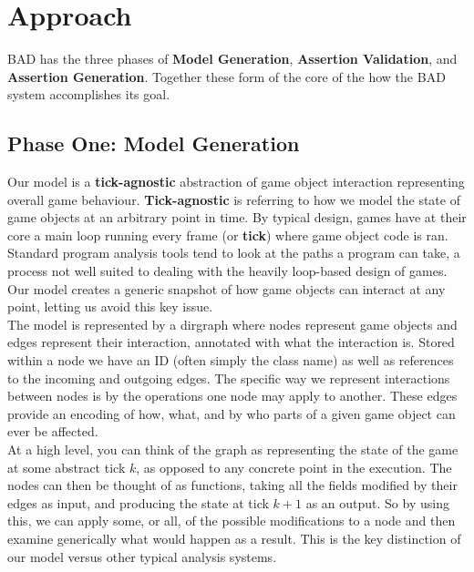 \documentclass[letterpaper,twocolumn,10pt]{article}
\begin{document}
\section{Approach}

BAD has the three phases of \textbf{Model Generation}, \textbf{Assertion Validation}, and \textbf{Assertion Generation}. Together these form of the core of the how the BAD system accomplishes its goal. 

\subsection{Phase One: Model Generation}

Our model is a \textbf{tick-agnostic} abstraction of game object interaction representing overall game behaviour. \textbf{Tick-agnostic} is referring to how we model the state of game objects at an arbitrary point in time. By typical design, games have at their core a main loop running every frame (or \textbf{tick}) where game object code is ran. Standard program analysis tools tend to look at the paths a program can take, a process not well suited to dealing with the heavily loop-based design of games. Our model creates a generic snapshot of how game objects can interact at any point, letting us avoid this key issue. \\

The model is represented by a dirgraph where nodes represent game objects and edges represent their interaction, annotated with what the interaction is. Stored within a node we have an ID (often simply the class name) as well as references to the incoming and outgoing edges. The specific way we represent interactions between nodes is by the operations one node may apply to another. These edges provide an encoding of how, what, and by who parts of a given game object can ever be affected. \\

At a high level, you can think of the graph as representing the state of the game at some abstract tick $k$, as opposed to any concrete point in the execution. The nodes can then be thought of as functions, taking all the fields modified by their edges as input, and producing the state at tick $k + 1$ as an output. So by using this, we can apply some, or all, of the possible modifications to a node and then examine generically what would happen as a result. This is the key distinction of our model versus other typical analysis systems. \\
\end{document}
